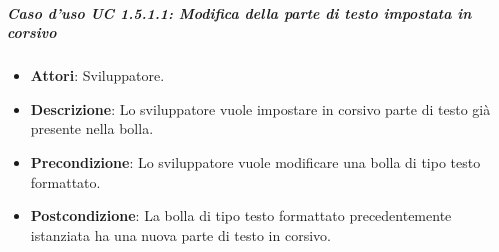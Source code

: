 \subparagraph{Caso d'uso UC 1.5.1.1: Modifica della parte di testo impostata in corsivo}


\FloatBarrier
\begin{itemize}
\item\textbf{Attori}: Sviluppatore.
\item\textbf{Descrizione}: Lo sviluppatore vuole impostare in corsivo parte di testo già presente nella bolla.
\item\textbf{Precondizione}: Lo sviluppatore vuole modificare una bolla di tipo testo formattato.
\item\textbf{Postcondizione}: La bolla di tipo testo formattato precedentemente istanziata ha una nuova parte di testo in corsivo.

\end{itemize}

